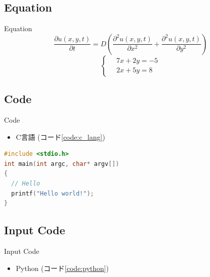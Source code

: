 \subsection{Equation}
\begin{frame}{Equation}
  \begin{equation}
    \frac{\partial u\left(x,y,t\right)}{\partial t}
    = D \left(\frac{{\partial}^2 u\left(x,y,t\right)}{\partial{x}^2}
    + \frac{\partial^2 u\left(x,y,t\right)}{\partial y^2}\right)
  \end{equation}
  \begin{equation}
    \left\{ \,
      \begin{aligned}
        & 7x + 2y = -5 \\
        & 2x + 5y = 8
      \end{aligned}
    \right.
  \end{equation}
\end{frame}

\subsection{Code}
\begin{frame}[fragile]{Code}
  \begin{itemize}
    \item C言語 (コード\ref{code:c_lang})
  \end{itemize}
  \begin{minipage}[t]{.95\linewidth}
    \begin{lstlisting}[language={c},caption={C言語},label={code:c_lang}]
#include <stdio.h>
int main(int argc, char* argv[])
{
  // Hello
  printf("Hello world!");
}
    \end{lstlisting}
  \end{minipage}
\end{frame}

\subsection{Input Code}
\begin{frame}[fragile]{Input Code}
  \begin{itemize}
    \item Python (コード\ref{code:python})
  \end{itemize}
  \begin{minipage}[t]{.95\linewidth}
    
  \end{minipage}
\end{frame}

